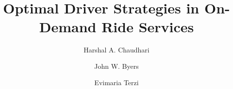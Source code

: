 \documentclass[sigconf]{acmart}
\begin{document}
\title{Optimal Driver Strategies in On-Demand Ride Services}

\author{Harshal A. Chaudhari}

\author{John W. Byers}

\author{Evimaria Terzi}


%
%
% 





\maketitle








%
 
\end{document}

